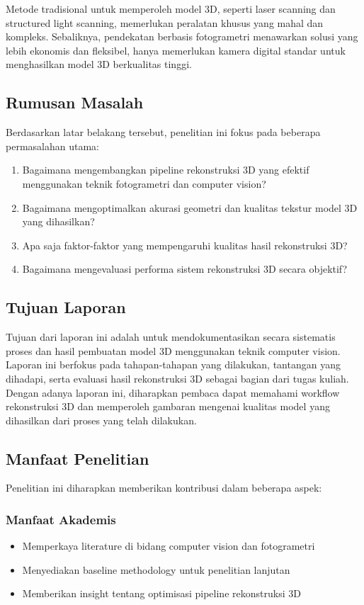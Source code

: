 \documentclass[12pt,a4paper]{article}
\begin{document}
Metode tradisional untuk memperoleh model 3D, seperti laser scanning dan structured light scanning, memerlukan peralatan khusus yang mahal dan kompleks. Sebaliknya, pendekatan berbasis fotogrametri menawarkan solusi yang lebih ekonomis dan fleksibel, hanya memerlukan kamera digital standar untuk menghasilkan model 3D berkualitas tinggi.

\subsection{Rumusan Masalah}

Berdasarkan latar belakang tersebut, penelitian ini fokus pada beberapa permasalahan utama:

\begin{enumerate}
    \item Bagaimana mengembangkan pipeline rekonstruksi 3D yang efektif menggunakan teknik fotogrametri dan computer vision?
    \item Bagaimana mengoptimalkan akurasi geometri dan kualitas tekstur model 3D yang dihasilkan?
    \item Apa saja faktor-faktor yang mempengaruhi kualitas hasil rekonstruksi 3D?
    \item Bagaimana mengevaluasi performa sistem rekonstruksi 3D secara objektif?
\end{enumerate}

\subsection{Tujuan Laporan}

Tujuan dari laporan ini adalah untuk mendokumentasikan secara sistematis proses dan hasil pembuatan model 3D menggunakan teknik computer vision. Laporan ini berfokus pada tahapan-tahapan yang dilakukan, tantangan yang dihadapi, serta evaluasi hasil rekonstruksi 3D sebagai bagian dari tugas kuliah. Dengan adanya laporan ini, diharapkan pembaca dapat memahami workflow rekonstruksi 3D dan memperoleh gambaran mengenai kualitas model yang dihasilkan dari proses yang telah dilakukan.

\subsection{Manfaat Penelitian}

Penelitian ini diharapkan memberikan kontribusi dalam beberapa aspek:

\subsubsection{Manfaat Akademis}
\begin{itemize}
    \item Memperkaya literature di bidang computer vision dan fotogrametri
    \item Menyediakan baseline methodology untuk penelitian lanjutan
    \item Memberikan insight tentang optimisasi pipeline rekonstruksi 3D
\end{itemize}
\end{document}
